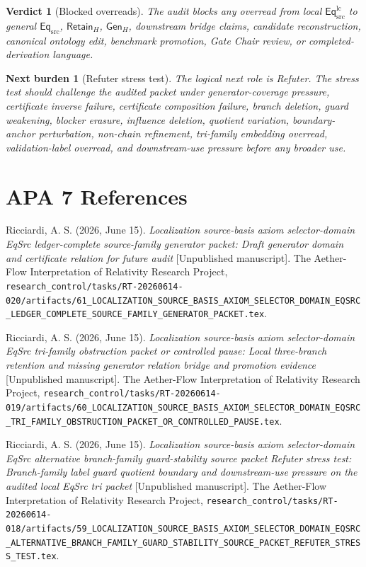 \documentclass[11pt]{article}
\newcommand{\EqSrc}{\mathsf{Eq}_{\mathrm{src}}}
\newcommand{\EqLC}{\mathsf{Eq}_{\mathrm{src}}^{\mathrm{lc}}}
\newcommand{\RetainH}{\mathsf{Retain}_{H}}
\newcommand{\GenH}{\mathsf{Gen}_{H}}
\newtheorem{verdict}{Verdict}
\newtheorem{nextburden}{Next burden}
\begin{document}
\begin{verdict}[Blocked overreads]
The audit blocks any overread from local \(\EqLC\) to general
\(\EqSrc\), \(\RetainH\), \(\GenH\), downstream bridge claims,
candidate reconstruction, canonical ontology edit, benchmark promotion,
Gate Chair review, or completed-derivation language.
\end{verdict}

\begin{nextburden}[Refuter stress test]
The logical next role is Refuter. The stress test should challenge the
audited packet under generator-coverage pressure, certificate inverse
failure, certificate composition failure, branch deletion, guard
weakening, blocker erasure, influence deletion, quotient variation,
boundary-anchor perturbation, non-chain refinement, tri-family embedding
overread, validation-label overread, and downstream-use pressure before
any broader use.
\end{nextburden}

\section*{APA 7 References}

Ricciardi, A. S. (2026, June 15). \emph{Localization source-basis axiom
selector-domain EqSrc ledger-complete source-family generator packet:
Draft generator domain and certificate relation for future audit}
[Unpublished manuscript]. The Aether-Flow Interpretation of Relativity
Research Project,
\texttt{research\_control/tasks/RT-20260614-020/artifacts/61\_LOCALIZATION\_SOURCE\_BASIS\_AXIOM\_SELECTOR\_DOMAIN\_EQSRC\_LEDGER\_COMPLETE\_SOURCE\_FAMILY\_GENERATOR\_PACKET.tex}.

Ricciardi, A. S. (2026, June 15). \emph{Localization source-basis axiom
selector-domain EqSrc tri-family obstruction packet or controlled pause:
Local three-branch retention and missing generator relation bridge and
promotion evidence} [Unpublished manuscript]. The Aether-Flow
Interpretation of Relativity Research Project,
\texttt{research\_control/tasks/RT-20260614-019/artifacts/60\_LOCALIZATION\_SOURCE\_BASIS\_AXIOM\_SELECTOR\_DOMAIN\_EQSRC\_TRI\_FAMILY\_OBSTRUCTION\_PACKET\_OR\_CONTROLLED\_PAUSE.tex}.

Ricciardi, A. S. (2026, June 15). \emph{Localization source-basis axiom
selector-domain EqSrc alternative branch-family guard-stability source
packet Refuter stress test: Branch-family label guard quotient boundary
and downstream-use pressure on the audited local EqSrc tri packet}
[Unpublished manuscript]. The Aether-Flow Interpretation of Relativity
Research Project,
\texttt{research\_control/tasks/RT-20260614-018/artifacts/59\_LOCALIZATION\_SOURCE\_BASIS\_AXIOM\_SELECTOR\_DOMAIN\_EQSRC\_ALTERNATIVE\_BRANCH\_FAMILY\_GUARD\_STABILITY\_SOURCE\_PACKET\_REFUTER\_STRESS\_TEST.tex}.
\end{document}

